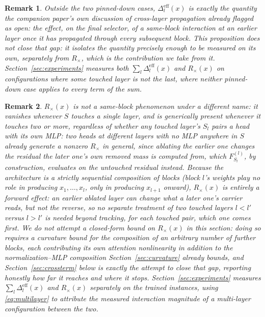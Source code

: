 \documentclass[11pt,a4paper]{article}
\newtheorem{remark}{Remark}
\begin{document}
\begin{remark}
\label{rem:multilayer-open}
Outside the two pinned-down cases, $\Delta_l^{\mathrm{eff}}(x)$ is exactly
the quantity the companion paper's own discussion of cross-layer propagation
already flagged as open: the effect, on the final selector, of a same-block
interaction at an \emph{earlier} layer once it has propagated through every
subsequent block. This proposition does not close that gap: it isolates the
quantity precisely enough to be measured on its own, separately from
$R_\times$, which is the contribution we take from it.
Section~\ref{sec:experiments} measures both $\sum_l\Delta_l^{\mathrm{eff}}(x)$
and $R_\times(x)$ on configurations where some touched layer is not the
last, where neither pinned-down case applies to every term of the sum.
\end{remark}

\begin{remark}
\label{rem:multilayer-scope}
$R_\times(x)$ is not a same-block phenomenon under a different name: it
vanishes whenever $S$ touches a single layer, and is generically present
whenever it touches two or more, regardless of whether any touched layer's
$S_l$ pairs a head with its own MLP: two heads at different layers with no
MLP anywhere in $S$ already generate a nonzero $R_\times$ in general, since
ablating the earlier one changes the residual the later one's own removed
mass is computed from, which $F_{S_l}^{(l)}$, by construction, evaluates on
the untouched residual instead. Because the architecture is a strictly
sequential composition of blocks (block $l$'s weights play no role in
producing $x_1,\dots,x_l$, only in producing $x_{l+1}$ onward), $R_\times(x)$
is entirely a \emph{forward} effect: an earlier ablated layer can change what
a later one's carrier reads, but not the reverse, so no separate treatment of
two touched layers $l<l'$ versus $l>l'$ is needed beyond tracking, for each
touched pair, which one comes first. We do not attempt a closed-form bound on
$R_\times(x)$ in this section: doing so requires a curvature bound for the
composition of an arbitrary number of further blocks, each contributing its
own attention nonlinearity in addition to the normalization--MLP composition
Section~\ref{sec:curvature} already bounds, and Section~\ref{sec:crossterm}
below is exactly the attempt to close that gap, reporting honestly how far it
reaches and where it stops. Section~\ref{sec:experiments} measures
$\sum_l\Delta_l^{\mathrm{eff}}(x)$ and $R_\times(x)$ separately on the trained
instances, using \eqref{eq:multilayer} to attribute the measured interaction
magnitude of a multi-layer configuration between the two.
\end{remark}
\end{document}

